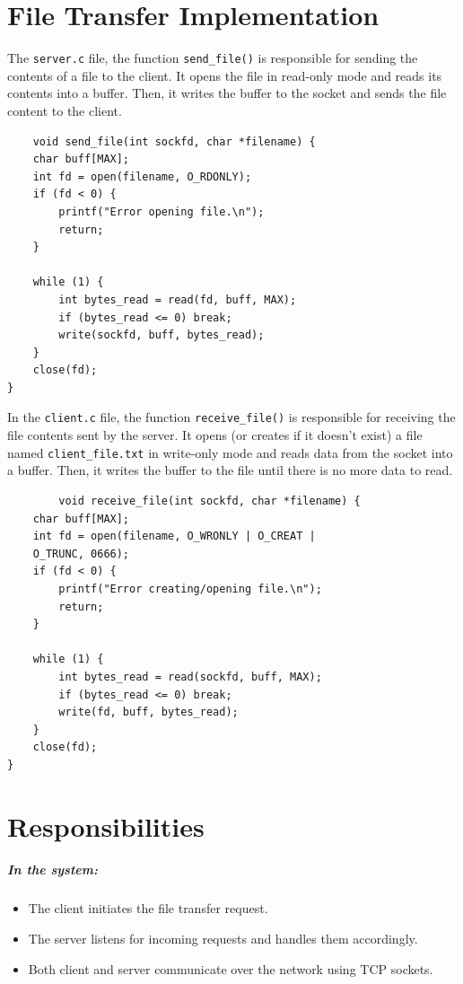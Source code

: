 \documentclass{article}
\begin{document}
\section{File Transfer Implementation}
The \texttt{server.c} file, the function \texttt{send\_file()} is responsible for sending the contents of a file to the client. It opens the file in read-only mode and reads its contents into a buffer. Then, it writes the buffer to the socket and sends the file content to the client.
\begin{mdframed}
    \begin{lstlisting}
    void send_file(int sockfd, char *filename) {
    char buff[MAX];
    int fd = open(filename, O_RDONLY);
    if (fd < 0) {
        printf("Error opening file.\n");
        return;
    }

    while (1) {
        int bytes_read = read(fd, buff, MAX);
        if (bytes_read <= 0) break;
        write(sockfd, buff, bytes_read);
    }
    close(fd);
}
    \end{lstlisting}
\end{mdframed}

In the \texttt{client.c} file, the function \texttt{receive\_file()} is responsible for receiving the file contents sent by the server. It opens (or creates if it doesn't exist) a file named \texttt{client\_file.txt} in write-only mode and reads data from the socket into a buffer. Then, it writes the buffer to the file until there is no more data to read.


\begin{mdframed}
    \begin{lstlisting}
        void receive_file(int sockfd, char *filename) {
    char buff[MAX];
    int fd = open(filename, O_WRONLY | O_CREAT | 
    O_TRUNC, 0666);
    if (fd < 0) {
        printf("Error creating/opening file.\n");
        return;
    }

    while (1) {
        int bytes_read = read(sockfd, buff, MAX);
        if (bytes_read <= 0) break;
        write(fd, buff, bytes_read);
    }
    close(fd);
}
    \end{lstlisting}
\end{mdframed}

\section{Responsibilities}
\subparagraph{In the system:}
\begin{itemize}
    \item The client initiates the file transfer request.
    \item The server listens for incoming requests and handles them accordingly.
    \item Both client and server communicate over the network using TCP sockets.
\end{itemize}
\end{document}
